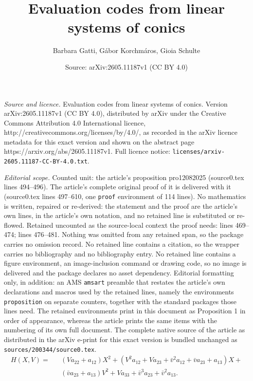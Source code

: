 \documentclass[10pt,a4paper]{amsart}
\title{Evaluation codes from linear systems of conics}
\author{Barbara Gatti, G\'abor Korchm\'aros, Gioia Schulte}
\date{Source: arXiv:2605.11187v1 (CC BY 4.0)}
\begin{document}
\maketitle

\noindent\emph{Source and licence.} Evaluation codes from linear systems of conics. Version arXiv:2605.11187v1 (CC BY 4.0), distributed by arXiv under the Creative Commons Attribution 4.0 International licence, http://creativecommons.org/licenses/by/4.0/, as recorded in the arXiv licence metadata for this exact version and shown on the abstract page https://arxiv.org/abs/2605.11187v1. Full licence notice: \texttt{licenses/arxiv-2605.11187-CC-BY-4.0.txt}.\par\smallskip

\noindent\textit{Editorial scope.} Counted unit: the article's proposition pro12082025 (source0.tex lines 494--496). The article's complete original proof of it is delivered with it (source0.tex lines 497--610, one \texttt{proof} environment of 114 lines). No mathematics is written, repaired or re-derived: the statement and the proof are the article's own lines, in the article's own notation, and no retained line is substituted or re-flowed.  Retained uncounted as the source-local context the proof needs: lines 469--474; lines 476--481.  Nothing was omitted from any retained span, so the package carries no omission record.  No retained line contains a citation, so the wrapper carries no bibliography and no bibliography entry.  No retained line contains a figure environment, an image-inclusion command or drawing code, so no image is delivered and the package declares no asset dependency.  Editorial formatting only, in addition: an AMS \texttt{amsart} preamble that restates the article's own declarations and macros used by the retained lines, namely the environments \texttt{proposition} on separate counters, together with the standard packages those lines need.  The retained environments print in this document as Proposition 1 in order of appearance, whereas the article prints the same items with the numbering of its own full document.  The complete native source of the article as distributed in the arXiv e-print for this exact version is bundled unchanged as \texttt{sources/200344/source0.tex}.
\begin{equation}
\label{eq09082025}
\begin{array}{llll}H(X,V)=&&(Va_{22}+a_{12})X^2+(V^2a_{12}+Va_{23}+\bar{v}^2a_{12}+\bar{v}a_{23}+a_{13})X+\\
&&(\bar{v}a_{23}+a_{13})V^2+Va_{33}+\bar{v}^3a_{23}+\bar{v}^2a_{13}.
\end{array}
\end{equation}
\end{document}
